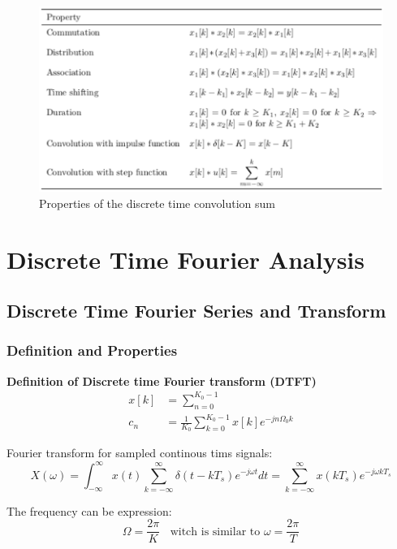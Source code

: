 \newpage
\begin{figure}[!h]
    \centering
    \includegraphics[width=12cm]{image/properties_of_the_discreate_time_convolution_sum.pdf}
    \caption{Properties of the discrete time convolution sum}
    \label{fig:properties_of_the_discreate_time_convolution_sum}
\end{figure}


\newpage
\section{Discrete Time Fourier Analysis}
\subsection{Discrete Time Fourier Series and Transform}
\subsubsection{Definition and Properties}
\textbf{Definition of Discrete time Fourier transform (DTFT)}
\begin{align*}
    x[k] &= \sum_{n=0}^{K_0-1} \\
    c_n  &= \frac{1}{K_0}\sum_{k=0}^{K_0-1} x[k]e^{-jn\Omega_0k}
\end{align*}

Fourier transform for sampled continous tims signals:
\begin{equation*}
    X(\omega) 
    = \int_{-\infty}^{\infty}x(t) \sum_{k=-\infty}^{\infty} \delta(t-kT_s)e^{-j\omega t}dt
    = \sum_{k=-\infty}^{\infty} x(kT_s)e^{-j\omega kT_s}
\end{equation*}

The frequency can be expression:
\begin{equation*}
    \Omega = \frac{2\pi}{K} \;\; \text{ witch is similar to } \omega=\frac{2\pi}{T}
\end{equation*}


